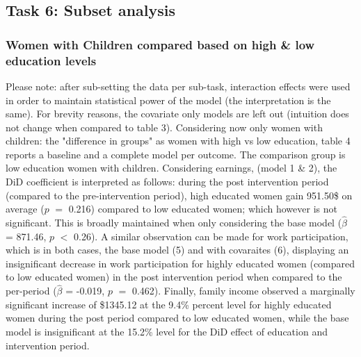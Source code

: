 \documentclass[a4paper]{article}
\begin{document}
\begin{landscape}
\end{landscape}


\subsection{Task 6: Subset analysis}

\subsubsection{Women with Children compared based on high \& low education levels}
Please note: after sub-setting the data per sub-task, interaction effects were used in order to maintain statistical power of the model (the interpretation is the same).
For brevity reasons, the covariate only models are left out (intuition does not change when compared to table 3). Considering now only women with children: the "difference in groups" as women with high vs low education, table 4 reports a baseline and a complete model per outcome. The comparison group is low education women with children.
Considering earnings, (model 1 \& 2), the DiD coefficient is interpreted as follows: during the post intervention period (compared to the pre-intervention period), high educated women gain 951.50\$ on average ($p$ $=$ 0.216) compared to low educated women; which however is not significant. This is broadly maintained when only considering the base model ($\hat{\beta}$ = 871.46, $p$ $<$ 0.26). A similar observation can be made for work participation, which is in both cases, the base model (5) and with covaraites (6), displaying an insignificant decrease in work participation for highly educated women (compared to low educated women) in the post intervention period when compared to the per-period ($\hat{\beta}$ = -0.019, $p$ $=$ 0.462). Finally, family income observed a marginally significant increase of \$1345.12 at the 9.4\% percent level for highly educated women during the post period compared to low educated women, while the base model is insignificant at the 15.2\% level for the DiD effect of education and intervention period. 
\end{document}
